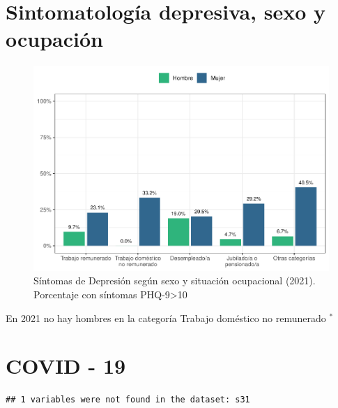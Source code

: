 \documentclass[
  12pt,
]{book}
\begin{document}
\hypertarget{sintomatologuxeda-depresiva-sexo-y-ocupaciuxf3n}{%
\section{Sintomatología depresiva, sexo y ocupación}\label{sintomatologuxeda-depresiva-sexo-y-ocupaciuxf3n}}

\begin{figure}

{\centering \includegraphics{reporte-elsoc_files/figure-latex/depre-labstat-1} 

}

\caption{Síntomas de Depresión según sexo y situación ocupacional (2021). Porcentaje con síntomas PHQ-9>10}\label{fig:depre-labstat}
\end{figure}

En 2021 no hay hombres en la categoría Trabajo doméstico no remunerado \(^{*}\)

\hypertarget{covid---19}{%
\section{COVID - 19}\label{covid---19}}

\begin{verbatim}
## 1 variables were not found in the dataset: s31
\end{verbatim}
\end{document}

